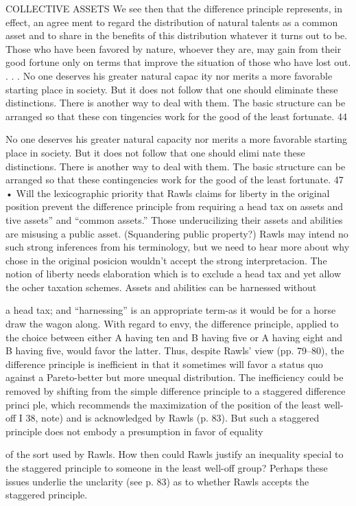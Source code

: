 \documentclass[11pt,openany]{book}
\begin{document}
{COLLECTIVE ASSETS We see then that the difference principle represents, in effect, an agree ment to regard the distribution of natural talents as a common asset and to share in the benefits of this distribution whatever it turns out to be. Those who have been favored by nature, whoever they are, may gain from their good fortune only on terms that improve the situation of those who have lost out. . . . No one deserves his greater natural capac ity nor merits a more favorable starting place in society. But it does not follow that one should eliminate these distinctions. There is another way to deal with them. The basic structure can be arranged so that these con tingencies work for the good of the least fortunate. 44\par

No one deserves his greater natural capacity nor merits a more favorable starting place in society. But it does not follow that one should elimi nate these distinctions. There is another way to deal with them. The basic structure can be arranged so that these contingencies work for the good of the least fortunate. 47 • Will the lexicographic priority that Rawls claims for liberty in the original position prevent the difference principle from requiring a head tax on assets and tive assets'' and ``common assets.'' Those underucilizing their assets and abilities are misusing a public asset. (Squandering public property?) Rawls may intend no such strong inferences from his terminology, but we need to hear more about why chose in the original posicion wouldn't accept the strong interpretacion. The notion of liberty needs elaboration which is to exclude a head tax and yet allow the ocher taxation schemes. Assets and abilities can be harnessed without\par

a head tax; and ``harnessing'' is an appropriate term-as it would be for a horse draw the wagon along. With regard to envy, the difference principle, applied to the choice between either A having ten and B having five or A having eight and B having five, would favor the latter. Thus, despite Rawls' view (pp. 79--80), the difference principle is inefficient in that it sometimes will favor a status quo against a Pareto-better but more unequal distribution. The inefficiency could be removed by shifting from the simple difference principle to a staggered difference princi ple, which recommends the maximization of the position of the least well-off I 38, note) and is acknowledged by Rawls (p. 83). But such a staggered principle does not embody a presumption in favor of equality\par

of the sort used by Rawls. How then could Rawls justify an inequality special to the staggered principle to someone in the least well-off group? Perhaps these issues underlie the unclarity (see p. 83) as to whether Rawls accepts the staggered principle.\par

}
\end{document}
